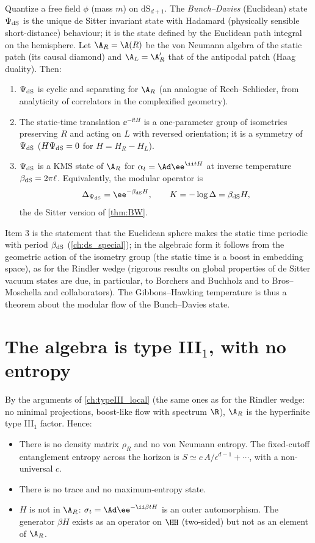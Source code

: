 Quantize a free field $\phi$ (mass $m$) on $\mathrm{dS}_{d+1}$. The \emph{Bunch--Davies} (Euclidean) state $\Psi_{\rm dS}$ is the unique de Sitter invariant state with Hadamard (physically sensible short-distance) behaviour; it is the state defined by the Euclidean path integral on the hemisphere. Let $\A_R=\A(R)$ be the von Neumann algebra of the static patch (its causal diamond) and $\A_L=\A_R'$ that of the antipodal patch (Haag duality). Then:
\begin{enumerate}
\item $\Psi_{\rm dS}$ is cyclic and separating for $\A_R$ (an analogue of Reeh--Schlieder, from analyticity of correlators in the complexified geometry).
\item The static-time translation $\ee^{-\ii tH}$ is a one-parameter group of isometries preserving $R$ and acting on $L$ with reversed orientation; it is a symmetry of $\Psi_{\rm dS}$ ($H\Psi_{\rm dS}=0$ for $H=H_R-H_L$).
\item $\Psi_{\rm dS}$ is a KMS state of $\A_R$ for $\alpha_t=\Ad\ee^{\ii tH}$ at inverse temperature $\beta_{\rm dS}=2\pi\ell$. Equivalently, the modular operator is
\begin{equation}
\Delta_{\Psi_{\rm dS}}=\ee^{-\beta_{\rm dS}H},\qquad K=-\log\Delta=\beta_{\rm dS}H,
\end{equation}
the de Sitter version of \cref{thm:BW}.
\end{enumerate}
Item 3 is the statement that the Euclidean sphere makes the static time periodic with period $\beta_{\rm dS}$ (\cref{ch:ds_special}); in the algebraic form it follows from the geometric action of the isometry group (the static time is a boost in embedding space), as for the Rindler wedge (rigorous results on global properties of de Sitter vacuum states are due, in particular, to Borchers and Buchholz and to Bros--Moschella and collaborators). The Gibbons--Hawking temperature is thus a theorem about the modular flow of the Bunch--Davies state.

\section{The algebra is type III$_1$, with no entropy}

By the arguments of \cref{ch:typeIII_local} (the same ones as for the Rindler wedge: no minimal projections, boost-like flow with spectrum $\R$), $\A_R$ is the hyperfinite type III$_1$ factor. Hence:
\begin{itemize}
\item There is no density matrix $\rho_R$ and no von Neumann entropy. The fixed-cutoff entanglement entropy across the horizon is $S\simeq c\,A/\epsilon^{d-1}+\cdots$, with a non-universal $c$.
\item There is no trace and no maximum-entropy state.
\item $H$ is not in $\A_R$: $\sigma_t=\Ad\ee^{-\ii\beta tH}$ is an outer automorphism. The generator $\beta H$ exists as an operator on $\HH$ (two-sided) but not as an element of $\A_R$.
\end{itemize}

